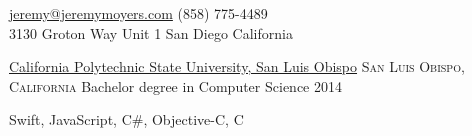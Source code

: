 \documentclass[10pt,a4paper]{article}
\begin{document}
\sloppy  %



\nobreakvspace{0.3em}  %

\noindent\href{mailto:jeremy.at.jeremymoyers.coml}{jeremy\mbox{}@\mbox{}jeremymoyers.com}\sbull
(858) 775-4489
\\
3130 Groton Way Unit 1\sbull
San Diego\thinspace {\large \sc }\sbull
California

\spacedhrule{0.9em}{-0.4em}  %


\headedsection
  {\href{https://www.calpoly.edu}{California Polytechnic State University, San Luis Obispo}}
  {\textsc{San Luis Obispo, California}} {%
  \headedsubsection
    {Bachelor degree in Computer Science}
    {2014}
    {\bodytext{}}
}
\vspace{-0.8em}


\spacedhrule{0.5em}{-0.4em}


\inlineheadsection  %
  {}
  {Swift, JavaScript, C\#, Objective-C, C }

\spacedhrule{1.6em}{-0.4em}

\end{document}
